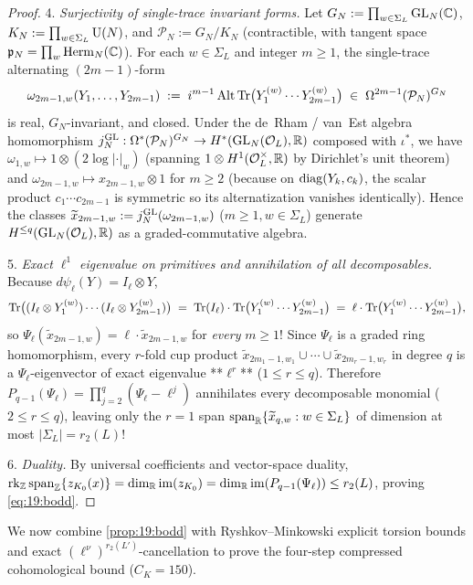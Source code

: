 \begin{proof}
4. \emph{Surjectivity of single-trace invariant forms.} Let $G_N := \prod_{w \in \Sigma_L}\mathrm{GL}_N(\mathbb{C})$, $K_N := \prod_{w \in \Sigma_L}\mathrm{U}(N)$, and $\mathcal{P}_N := G_N / K_N$ (contractible, with tangent space $\mathfrak{p}_N = \prod_w \mathrm{Herm}_N(\mathbb{C})$). For each $w \in \Sigma_L$ and integer $m \ge 1$, the single-trace alternating $(2m-1)$-form
\[
  \omega_{2m-1, w}(Y_1, \dots, Y_{2m-1}) \;:=\; i^{m-1}\operatorname{Alt}\operatorname{Tr}\bigl(Y_1^{(w)} \cdots Y_{2m-1}^{(w)}\bigr) \;\in\; \Omega^{2m-1}(\mathcal{P}_N)^{G_N}
\]
is real, $G_N$-invariant, and closed. Under the de~Rham / van~Est algebra homomorphism $j_N^{\mathrm{GL}} : \Omega^*(\mathcal{P}_N)^{G_N} \to H^*(\mathrm{GL}_N(\mathcal{O}_L), \mathbb{R})$ composed with $\iota^*$, we have $\omega_{1,w} \mapsto 1 \otimes (2\log|\cdot|_w)$ (spanning $1 \otimes H^1(\mathcal{O}_L^\times, \mathbb{R})$ by Dirichlet's unit theorem) and $\omega_{2m-1, w} \mapsto x_{2m-1, w} \otimes 1$ for $m \ge 2$ (because on $\operatorname{diag}(Y_k, c_k)$, the scalar product $c_1\cdots c_{2m-1}$ is symmetric so its alternatization vanishes identically). Hence the classes $\widetilde{x}_{2m-1, w} := j_N^{\mathrm{GL}}(\omega_{2m-1, w})$ ($m \ge 1, w \in \Sigma_L$) generate $H^{\le q}(\mathrm{GL}_N(\mathcal{O}_L), \mathbb{R})$ as a graded-commutative algebra.

5. \emph{Exact $\ell^1$ eigenvalue on primitives and annihilation of all decomposables.} Because $d\psi_\ell(Y) = I_\ell \otimes Y$,
\[
  \operatorname{Tr}\bigl((I_\ell \otimes Y_1^{(w)})\cdots(I_\ell \otimes Y_{2m-1}^{(w)})\bigr)
  \;=\; \operatorname{Tr}(I_\ell)\cdot \operatorname{Tr}\bigl(Y_1^{(w)}\cdots Y_{2m-1}^{(w)}\bigr)
  \;=\; \ell \cdot \operatorname{Tr}\bigl(Y_1^{(w)}\cdots Y_{2m-1}^{(w)}\bigr),
\]
so $\Psi_\ell(\widetilde{x}_{2m-1, w}) = \ell \cdot \widetilde{x}_{2m-1, w}$ for \emph{every} $m \ge 1$! Since $\Psi_\ell$ is a graded ring homomorphism, every $r$-fold cup product $\widetilde{x}_{2m_1-1, w_1} \cup \cdots \cup \widetilde{x}_{2m_r-1, w_r}$ in degree $q$ is a $\Psi_\ell$-eigenvector of exact eigenvalue **$\ell^r$** ($1 \le r \le q$). Therefore $P_{q-1}(\Psi_\ell) = \prod_{j=2}^{q}(\Psi_\ell - \ell^j)$ annihilates every decomposable monomial ($2 \le r \le q$), leaving only the $r = 1$ span $\operatorname{span}_{\mathbb{R}}\{\widetilde{x}_{q, w} : w \in \Sigma_L\}$ of dimension at most $|\Sigma_L| = r_2(L)$!

6. \emph{Duality.} By universal coefficients and vector-space duality, $\operatorname{rk}_{\mathbb{Z}}\operatorname{span}_{\mathbb{Z}}\{z_{K_0}(x)\} = \dim_{\mathbb{R}}\operatorname{im}(z_{K_0}) = \dim_{\mathbb{R}}\operatorname{im}(P_{q-1}(\Psi_\ell)) \le r_2(L)$, proving \eqref{eq:19:bodd}.
\end{proof}

We now combine \cref{prop:19:bodd} with Ryshkov--Minkowski explicit torsion bounds and exact $(\ell^\nu)^{r_2(L')}$-cancellation to prove the four-step compressed cohomological bound ($C_K = 150$).

